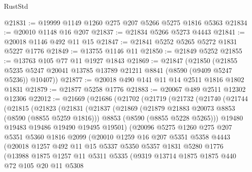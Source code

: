 \begin{lexlean}{RustStd}
\begin{coremodule}
@21831 := @19999 @1149 @1260 @275 @207 @5266 @5275 @1816 @5363
@21834 := @20010 @1148 @16 @207
@21837 := @21834 @5266 @5273 @4443
@21841 := @20018 @1146 @492 @11 @15
@21847 := @21841 @5252 @5265 @5272 @1831 @5227 @1776
@21849 := @13755 @1146 @11
@21850 := @21849 @5252
@21855 := @13763 @105 @77 @11 @1927 @1843
@21869 := @21847
    (@21850
      (@21855 @5235 @5247 @20041 @13785 @13789 @21211 @8841 (@8590 (@9409 @5247 @5236)) @10407))
@21877 := @20018 @490 @141 @11 @14 @2511 @1816 @1802 @1831
@21879 := @21877 @5258 @1776
@21883 := @20067 @489 @2511 @12302 @12306
@22012 := @21669
    (@21686
      (@21702
        (@21719
          (@21732
            (@21740
              (@21744
                (@21815
                  (@21823
                    (@21831
                      (@21837
                        (@21869
                          (@21879 @21883 @20073 @8853 (@8590 (@8855 @5259 @1816)))
                          @8853
                          (@8590 (@8855 @5228 @5265)))
                        @19480
                        @19483
                        @19486
                        @19490
                        @19495
                        @19501)
                      (@20096
                        @5275
                        @1260
                        @275
                        @207
                        @5351
                        @5360
                        @1816
                        @2099
                        (@20010
                          @1259
                          @16
                          @207
                          @5351
                          @5358
                          @4443
                          (@20018
                            @1257
                            @492
                            @11
                            @15
                            @5337
                            @5350
                            @5357
                            @1831
                            @5280
                            @1776
                            (@13988
                              @1875
                              @1257
                              @11
                              @5311
                              @5335
                              (@9319
                                @13714
                                @1875
                                @1875
                                @440
                                @72
                                @105
                                @20
                                @11
                                @5308

\end{coremodule}
\end{lexlean}
